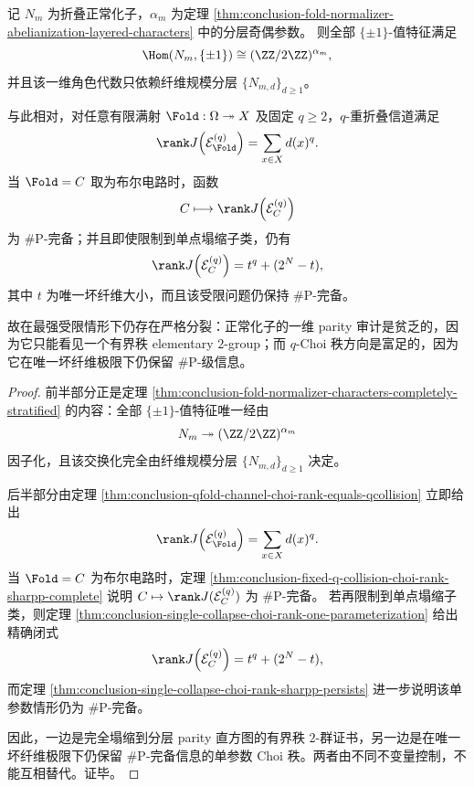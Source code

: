 \begin{theorem}\label{thm:conclusion-parity-poor-choi-rank-rich-orthogonal}
记 \(N_m\) 为折叠正常化子，\(\alpha_m\) 为定理 \ref{thm:conclusion-fold-normalizer-abelianization-layered-characters} 中的分层奇偶参数。
则全部 \(\{\pm1\}\)-值特征满足
\[
\Hom(N_m,\{\pm1\})\cong (\ZZ/2\ZZ)^{\alpha_m},
\]
并且该一维角色代数只依赖纤维规模分层
\(
\{N_{m,d}\}_{d\ge 1}
\)。

与此相对，对任意有限满射 \(\Fold:\Omega\twoheadrightarrow X\) 及固定 \(q\ge 2\)，\(q\)-重折叠信道满足
\[
\rank J\!\left(\mathcal E_{\Fold}^{(q)}\right)=\sum_{x\in X}d(x)^q.
\]
当 \(\Fold=C\) 取为布尔电路时，函数
\[
C\longmapsto \rank J\!\left(\mathcal E_C^{(q)}\right)
\]
为 \(\#\mathrm P\)-完备；并且即使限制到单点塌缩子类，仍有
\[
\rank J\!\left(\mathcal E_C^{(q)}\right)=t^q+(2^N-t),
\]
其中 \(t\) 为唯一坏纤维大小，而且该受限问题仍保持 \(\#\mathrm P\)-完备。

故在最强受限情形下仍存在严格分裂：正常化子的一维 parity 审计是贫乏的，因为它只能看见一个有界秩 elementary \(2\)-group；而 \(q\)-Choi 秩方向是富足的，因为它在唯一坏纤维极限下仍保留 \(\#\mathrm P\)-级信息。
\end{theorem}
\begin{proof}
前半部分正是定理 \ref{thm:conclusion-fold-normalizer-characters-completely-stratified} 的内容：全部 \(\{\pm1\}\)-值特征唯一经由
\[
N_m\twoheadrightarrow (\ZZ/2\ZZ)^{\alpha_m}
\]
因子化，且该交换化完全由纤维规模分层 \(\{N_{m,d}\}_{d\ge 1}\) 决定。

后半部分由定理 \ref{thm:conclusion-qfold-channel-choi-rank-equals-qcollision} 立即给出
\[
\rank J\!\left(\mathcal E_{\Fold}^{(q)}\right)=\sum_{x\in X}d(x)^q.
\]
当 \(\Fold=C\) 为布尔电路时，定理 \ref{thm:conclusion-fixed-q-collision-choi-rank-sharpp-complete} 说明 \(C\mapsto \rank J(\mathcal E_C^{(q)})\) 为 \(\#\mathrm P\)-完备。
若再限制到单点塌缩子类，则定理 \ref{thm:conclusion-single-collapse-choi-rank-one-parameterization} 给出精确闭式
\[
\rank J\!\left(\mathcal E_C^{(q)}\right)=t^q+(2^N-t),
\]
而定理 \ref{thm:conclusion-single-collapse-choi-rank-sharpp-persists} 进一步说明该单参数情形仍为 \(\#\mathrm P\)-完备。

因此，一边是完全塌缩到分层 parity 直方图的有界秩 \(2\)-群证书，另一边是在唯一坏纤维极限下仍保留 \(\#\mathrm P\)-完备信息的单参数 Choi 秩。两者由不同不变量控制，不能互相替代。证毕。
\end{proof}

